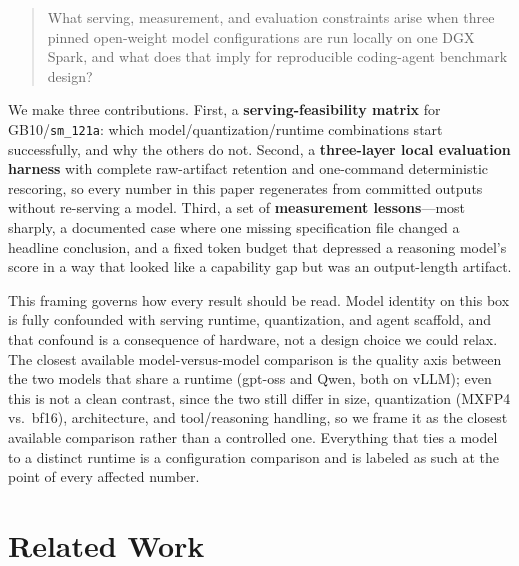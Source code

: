 \documentclass[10pt,twocolumn]{article}
\newcommand{\code}[1]{\texttt{\small #1}}
\begin{document}
\begin{quote}
What serving, measurement, and evaluation constraints arise when three pinned open-weight
model configurations are run locally on one DGX Spark, and what does that imply for
reproducible coding-agent benchmark design?
\end{quote}

We make three contributions. First, a \textbf{serving-feasibility matrix} for
GB10/\code{sm\_121a}: which model/quantization/runtime combinations start successfully, and
why the others do not. Second, a \textbf{three-layer local evaluation harness} with
complete raw-artifact retention and one-command deterministic rescoring, so every number in
this paper regenerates from committed outputs without re-serving a model. Third, a set of
\textbf{measurement lessons}---most sharply, a documented case where one missing
specification file changed a headline conclusion, and a fixed token budget that depressed a
reasoning model's score in a way that looked like a capability gap but was an output-length
artifact.

This framing governs how every result should be read. Model
identity on this box is fully confounded with serving runtime, quantization, and agent
scaffold, and that confound is a consequence of hardware, not a design choice we could
relax. The closest available model-versus-model comparison is the quality axis between the
two models that share a runtime (gpt-oss and Qwen, both on vLLM); even this is not a clean
contrast, since the two still differ in size, quantization (MXFP4 vs.\ bf16), architecture,
and tool/reasoning handling, so we frame it as the closest available comparison rather than a
controlled one. Everything that ties a model to a distinct runtime is a configuration
comparison and is labeled as such at the point of every affected number.

\section{Related Work}
\end{document}
